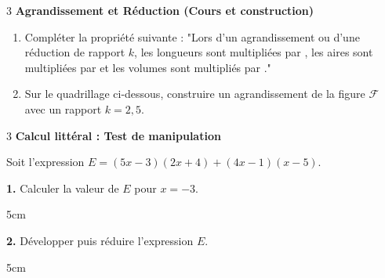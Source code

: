\documentclass[a4paper]{book}
\begin{document}
{    \begin{exerciceNote}{3}
        \textbf{Agrandissement et Réduction (Cours et construction)}
        \begin{enumerate}
            \item Compléter la propriété suivante : "Lors d'un agrandissement ou d'une réduction de rapport $k$, les longueurs sont multipliées par \points[2], les aires sont multipliées par \points[2] et les volumes sont multipliés par \points[2]."
            \item Sur le quadrillage ci-dessous, construire un agrandissement de la figure $\mathcal{F}$ avec un rapport $k = 2,5$.
        \end{enumerate}

        
        \begin{center}
        \end{center}
    \end{exerciceNote}

    
    \begin{exerciceNote}{3}
        \textbf{Calcul littéral : Test de manipulation}
        
        Soit l'expression $E = (5x-3)(2x+4) + (4x-1)(x-5)$.

        \medskip

        \begin{minipage}{0.5\linewidth}
            \textbf{1.} Calculer la valeur de $E$ pour $x = -3$.
            \begin{ZoneReponse}{5cm}
            \end{ZoneReponse}
        \end{minipage}
        \hfill
        \begin{minipage}{0.49\linewidth}
            \textbf{2.} Développer puis réduire l'expression $E$.
            \begin{ZoneReponse}{5cm}
            \end{ZoneReponse}
        \end{minipage}
    \end{exerciceNote}


}
\end{document}
